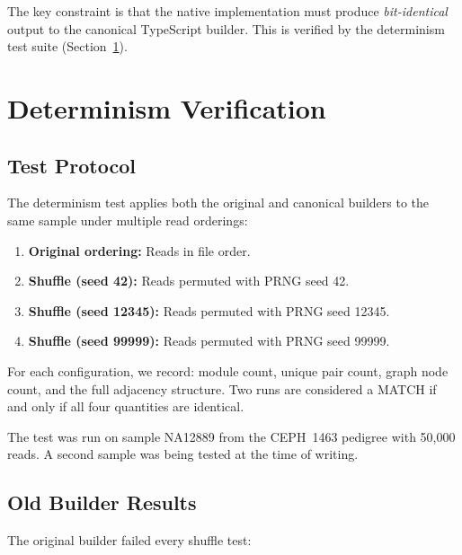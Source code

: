 \documentclass{../yalumba}
\begin{document}
The key constraint is that the native implementation must produce
\textit{bit-identical} output to the canonical TypeScript builder. This is
verified by the determinism test suite (Section~\ref{sec:verification}).


\section{Determinism Verification}
\label{sec:verification}

\subsection{Test Protocol}

The determinism test applies both the original and canonical builders to the
same sample under multiple read orderings:

\begin{enumerate}[leftmargin=2em]
  \item \textbf{Original ordering:} Reads in file order.
  \item \textbf{Shuffle (seed 42):} Reads permuted with PRNG seed 42.
  \item \textbf{Shuffle (seed 12345):} Reads permuted with PRNG seed 12345.
  \item \textbf{Shuffle (seed 99999):} Reads permuted with PRNG seed 99999.
\end{enumerate}

For each configuration, we record: module count, unique pair count, graph node
count, and the full adjacency structure. Two runs are considered a MATCH if and
only if all four quantities are identical.

The test was run on sample NA12889 from the CEPH~1463 pedigree with 50,000
reads. A second sample was being tested at the time of writing.

\subsection{Old Builder Results}

The original builder failed every shuffle test:
\end{document}
